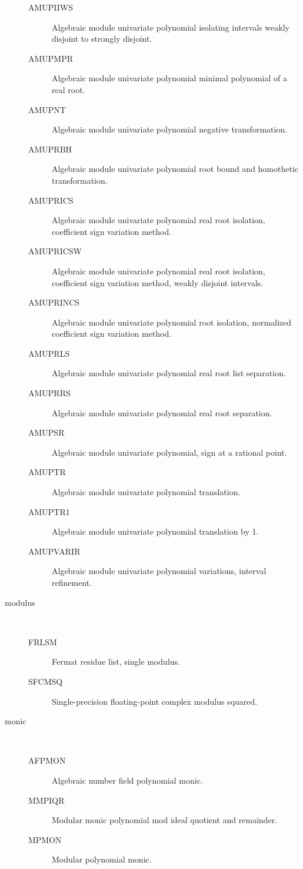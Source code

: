 \begin{description}
\begin{description}
  \item[AMUPIIWS]  Algebraic module univariate polynomial isolating intervals
    weakly disjoint to strongly disjoint.
  \item[AMUPMPR]  Algebraic module univariate polynomial minimal polynomial of
    a real root.
  \item[AMUPNT]  Algebraic module univariate polynomial negative
    transformation.
  \item[AMUPRBH]  Algebraic module univariate polynomial root bound and
    homothetic transformation.
  \item[AMUPRICS]  Algebraic module univariate polynomial real root isolation,
    coefficient sign variation method.
  \item[AMUPRICSW]  Algebraic module univariate polynomial real root
    isolation, coefficient sign variation method, weakly disjoint intervals.
  \item[AMUPRINCS]  Algebraic module univariate polynomial root isolation,
    normalized coefficient sign variation method.
  \item[AMUPRLS]  Algebraic module univariate polynomial real root list
    separation.
  \item[AMUPRRS]  Algebraic module univariate polynomial real root separation.
  \item[AMUPSR]  Algebraic module univariate polynomial, sign at a rational
    point.
  \item[AMUPTR]  Algebraic module univariate polynomial translation.
  \item[AMUPTR1]  Algebraic module univariate polynomial translation by 1.
  \item[AMUPVARIR]  Algebraic module univariate polynomial variations,
    interval refinement.
  \end{description}
\item[modulus] \ \ 
  \begin{description}
  \item[FRLSM]  Fermat residue list, single modulus.
  \item[SFCMSQ]  Single-precision floating-point complex modulus squared.
  \end{description}
\item[monic] \ \ 
  \begin{description}
  \item[AFPMON]  Algebraic number field polynomial monic.
  \item[MMPIQR]  Modular monic polynomial mod ideal quotient and remainder.
  \item[MPMON]  Modular polynomial monic.

\end{description}
\end{description}
